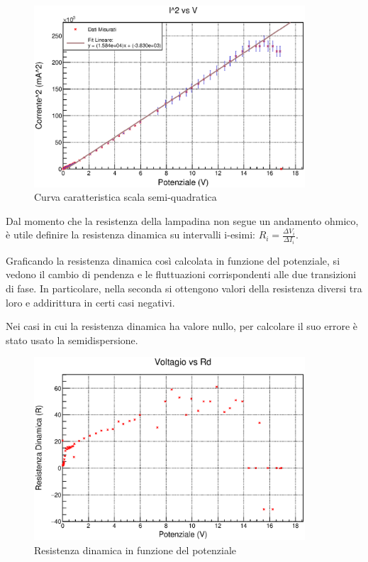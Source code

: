 \documentclass[a4paper]{article}
\begin{document}
\begin{figure}[!htbp]
  \centering
      \includegraphics[width=0.9\textwidth]{immagini/I2vsV.eps}
        \caption{Curva caratteristica scala semi-quadratica}
\end{figure}
\FloatBarrier

Dal momento che la resistenza della lampadina non segue un andamento ohmico, è utile definire la resistenza dinamica su intervalli i-esimi: $R_{i} = \frac{\Delta V_i}{\Delta I_i}$. 

Graficando la resistenza dinamica così calcolata in funzione del potenziale, si vedono il cambio di pendenza e le fluttuazioni corrispondenti alle due transizioni di fase. In particolare, nella seconda si ottengono valori della resistenza diversi tra loro e addirittura in certi casi negativi. 

Nei casi in cui la resistenza dinamica ha valore nullo, per calcolare il suo errore è stato usato la semidispersione. 

\begin{figure}[!htbp]
  \centering
      \includegraphics[width=0.9\textwidth]{immagini/fotodiodord.eps}
        \caption{Resistenza dinamica in funzione del potenziale}
\end{figure}
\FloatBarrier
\end{document}
